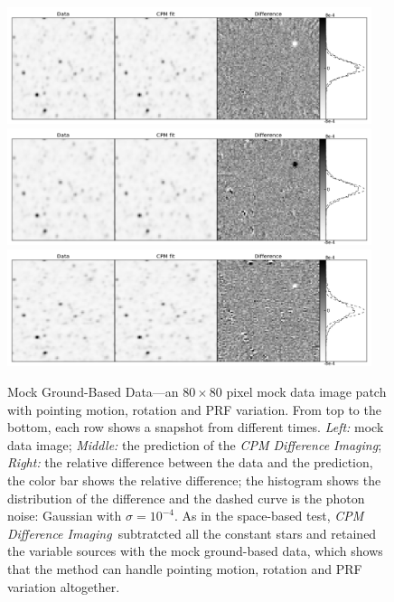 \documentclass[12pt, preprint]{aastex}
\newcommand{\project}[1]{\textsl{#1}}
\newcommand{\cpmdiff}{\project{CPM Difference Imaging}}
\begin{document}
\begin{figure}[p]
\begin{center}
\includegraphics[width=0.95\textwidth]{f3a}
\includegraphics[width=0.95\textwidth]{f3b}
\includegraphics[width=0.95\textwidth]{f3c}
\end{center}
\caption{
  \label{ground}
  Mock Ground-Based Data---an $80\times 80$ pixel mock data image patch with pointing motion, rotation and PRF variation. 
  From top to the bottom,  each row shows a snapshot from different times.
  \emph{Left:} mock data image;
  \emph{Middle:} the prediction of the \cpmdiff;
  \emph{Right:} the relative difference between the data and the prediction, the color bar shows the relative difference; 
  the histogram shows the distribution of the difference and the dashed curve is the photon noise: Gaussian with $\sigma = 10^{-4}$. 
  As in the space-based test, \cpmdiff\ subtratcted all the constant stars and retained the variable sources with the mock ground-based data, which shows that the method can handle pointing motion, rotation and PRF variation altogether. 
}
\end{figure}
\end{document}
